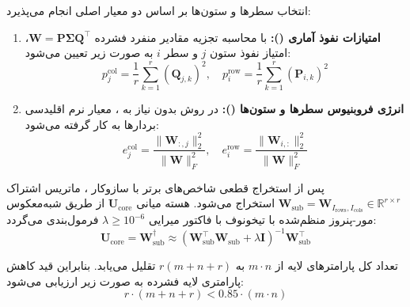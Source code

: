 انتخاب سطرها و ستون‌ها بر اساس دو معیار اصلی انجام می‌پذیرد:
\begin{enumerate}
    \item \textbf{امتیازات نفوذ آماری ():} با محاسبه تجزیه مقادیر منفرد فشرده $\mathbf{W} = \mathbf{P} \mathbf{\Sigma} \mathbf{Q}^\top$، امتیاز نفوذ ستون $j$ و سطر $i$ به صورت زیر تعیین می‌شود:
    \begin{equation}
    p_j^{\text{col}} = \frac{1}{r} \sum_{k=1}^r (\mathbf{Q}_{j, k})^2, \quad p_i^{\text{row}} = \frac{1}{r} \sum_{k=1}^r (\mathbf{P}_{i, k})^2
    \end{equation}
    \item \textbf{انرژی فروبنیوس سطرها و ستون‌ها ():} در روش بدون نیاز به ، معیار نرم اقلیدسی بردارها به کار گرفته می‌شود:
    \begin{equation}
    e_j^{\text{col}} = \frac{\|\mathbf{W}_{:, j}\|_2^2}{\|\mathbf{W}\|_F^2}, \quad e_i^{\text{row}} = \frac{\|\mathbf{W}_{i, :}\|_2^2}{\|\mathbf{W}\|_F^2}
    \end{equation}
\end{enumerate}

پس از استخراج قطعی شاخص‌های برتر با سازوکار ، ماتریس اشتراک $\mathbf{W}_{\text{sub}} = \mathbf{W}_{I_{\text{rows}}, I_{\text{cols}}} \in \mathbb{R}^{r \times r}$ استخراج می‌شود. هسته میانی $\mathbf{U}_{\text{core}}$ از طریق شبه‌معکوس مور-پنروز منظم‌شده با تیخونوف با فاکتور میرایی $\lambda \ge 10^{-6}$ فرمول‌بندی می‌گردد:
\begin{equation}
\mathbf{U}_{\text{core}} = \mathbf{W}_{\text{sub}}^\dagger \approx (\mathbf{W}_{\text{sub}}^\top \mathbf{W}_{\text{sub}} + \lambda \mathbf{I})^{-1} \mathbf{W}_{\text{sub}}^\top
\end{equation}

تعداد کل پارامترهای لایه از $m \cdot n$ به $r(m + n + r)$ تقلیل می‌یابد. بنابراین قید کاهش پارامتری لایه فشرده به صورت زیر ارزیابی می‌شود:
\begin{equation}
r \cdot (m + n + r) < 0.85 \cdot (m \cdot n)
\end{equation}


